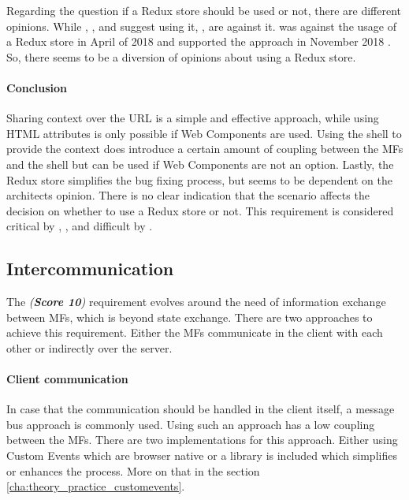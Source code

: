 Regarding the question if a Redux store should be used or not, there are different opinions.
While \textciteJovanovic{}, \textcite{Dornenburg.2019}, \textcite{Laug.2018b} and \textcite{Jackson.2019} suggest using it,  \textciteSteyer{}, \textcite{Leitner.2020} are against it.
\citeauthor{Laug.2018} was against the usage of a Redux store in April of 2018 and supported the approach in November 2018 \cite{Laug.2018b}.
So, there seems to be a diversion of opinions about using a Redux store.



\paragraph{Conclusion}

Sharing context over the \ac{URL} is a simple and effective approach, while using \ac{HTML} attributes is only possible if Web Components are used.
Using the shell to provide the context does introduce a certain amount of coupling between the \acp{MF} and the shell but can be used if Web Components are not an option.
Lastly, the Redux store simplifies the bug fixing process, but seems to be dependent on the architects opinion.
There is no clear indication that the scenario affects the decision on whether to use a Redux store or not.
This requirement is considered critical by \textciteRehm{}, \textciteSteyer{}, \textciteJovanovic{} and difficult by \textciteOlleck{}.





\subsection{Intercommunication}\label{cha:requirement_detail_state_intercommunication}

The \textit{ (\textbf{Score 10})} requirement evolves around the need of information exchange between \acp{MF}, which is beyond state exchange.
There are two approaches to achieve this requirement.
Either the \acp{MF} communicate in the client with each other or indirectly over the server.



\paragraph{Client communication}

In case that the communication should be handled in the client itself, a message bus approach is commonly used.
Using such an approach has a low coupling between the \acp{MF}.
There are two implementations for this approach.
Either using Custom Events which are browser native or a library is included which simplifies or enhances the process.
More on that in the section \ref{cha:theory_practice_customevents}.

